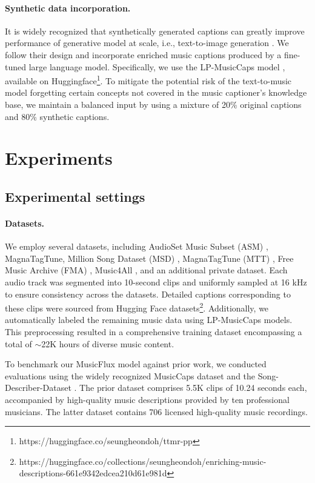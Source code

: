 \paragraph{Synthetic data incorporation.}

It is widely recognized that synthetically generated captions can greatly improve performance of generative model at scale, i.e., text-to-image generation \cite{fei2024dimba,chen2023pixart,betker2023improving,fei2021partially,fei2022deecap}.  
We follow their design and incorporate enriched music captions produced by a fine-tuned large language model.  
Specifically, we use the LP-MusicCaps model \cite{doh2024enriching,doh2023lp}, available on  Huggingface\footnote{https://huggingface.co/seungheondoh/ttmr-pp}.
To mitigate the potential risk of the text-to-music model forgetting certain concepts not covered in the music captioner’s knowledge base, we maintain a balanced input by using a mixture of 20\% original captions and 80\% synthetic captions.

\section{Experiments}

\subsection{Experimental settings}
\paragraph{Datasets.} 
We employ several datasets, including AudioSet Music Subset (ASM) \cite{gemmeke2017audio}, MagnaTagTune, Million Song Dataset (MSD) \cite{bertin2011million}, MagnaTagTune (MTT) \cite{law2009evaluation}, Free Music Archive (FMA) \cite{defferrard2016fma}, Music4All \cite{santana2020music4all}, and an additional private dataset. 
Each audio track was segmented into 10-second clips and uniformly sampled at 16 kHz to ensure consistency across the datasets. Detailed captions corresponding to these clips were sourced from Hugging Face datasets\footnote{https://huggingface.co/collections/seungheondoh/enriching-music-descriptions-661e9342edcea210d61e981d}. Additionally, we automatically labeled the remaining music data using LP-MusicCaps models. This preprocessing resulted in a comprehensive training dataset encompassing a total of $\sim$22K hours of diverse music content. 

To benchmark our MusicFlux model against prior work, we conducted evaluations using the widely recognized MusicCaps dataset \citep{agostinelli2023musiclm} and the Song-Describer-Dataset \citep{manco2023song}. The prior dataset comprises 5.5K clips of 10.24 seconds each, accompanied by high-quality music descriptions provided by ten professional musicians. The latter dataset contains 706 licensed high-quality music recordings. 

